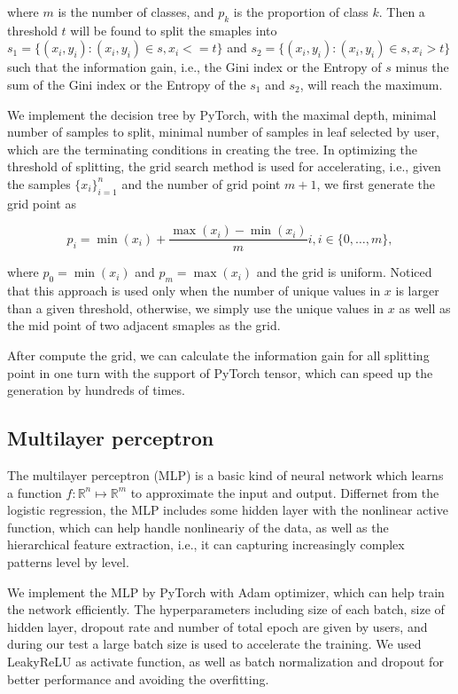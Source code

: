 \documentclass[11pt]{article}
\begin{document}
\noindent where $m$ is the number of classes, and $p_k$ is the proportion of class $k$. Then a threshold $t$ will be found to split the smaples into $s_1 = \{(x_i, y_i): (x_i, y_i) \in s, x_i <= t \}$ and $s_2 = \{(x_i, y_i): (x_i, y_i) \in s, x_i > t \}$ such that the information gain, i.e., the Gini index or the Entropy of $s$ minus the sum of the Gini index or the Entropy of the $s_1$ and $s_2$, will reach the maximum.

We implement the decision tree by PyTorch, with the maximal depth, minimal number of samples to split, minimal number of samples in leaf selected by user, which are the terminating conditions in creating the tree. In optimizing the threshold of splitting, the grid search method is used for accelerating, i.e., given the samples $\{x_i\}_{i=1}^n$ and the number of grid point $m + 1$, we first generate the grid point as

$$
  p_i = \min(x_i) + \frac{\max(x_i) - \min(x_i)}{m} i, i \in \{0, \dots, m\},
$$

\noindent where $p_0 = \min(x_i)$ and $p_{m} = \max(x_i)$ and the grid is uniform. Noticed that this approach is used only when the number of unique values in $x$ is larger than a given threshold, otherwise, we simply use the unique values in $x$ as well as the mid point of two adjacent smaples as the grid.

After compute the grid, we can calculate the information gain for all splitting point in one turn with the support of PyTorch tensor, which can speed up the generation by hundreds of times.

\subsection{Multilayer perceptron}

The multilayer perceptron (MLP) is a basic kind of neural network which learns a function $f: \mathbb{R}^n \mapsto \mathbb{R}^m$ to approximate the input and output. Differnet from the logistic regression, the MLP includes some hidden layer with the nonlinear active function, which can help handle nonlineariy of the data, as well as the hierarchical feature extraction, i.e., it can capturing increasingly complex patterns level by level.

We implement the MLP by PyTorch with Adam optimizer, which can help train the network efficiently. The hyperparameters including size of each batch, size of hidden layer, dropout rate and number of total epoch are given by users, and during our test a large batch size is used to accelerate the training. We used LeakyReLU as activate function, as well as batch normalization and dropout for better performance and avoiding the overfitting.
\end{document}

